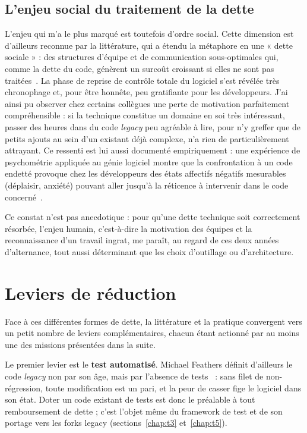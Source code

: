 \subsection{L'enjeu social du traitement de la dette}
L'enjeu qui m'a le plus marqué est toutefois d'ordre social. Cette dimension
est d'ailleurs reconnue par la littérature, qui a étendu la métaphore en une
« dette sociale » : des structures d'équipe et de communication sous-optimales
qui, comme la dette du code, génèrent un surcoût croissant si elles ne sont pas
traitées~\cite{tamburri2015}. La phase de reprise
de contrôle totale du logiciel s'est révélée très chronophage et, pour être
honnête, peu gratifiante pour les développeurs. J'ai ainsi pu observer chez
certains collègues une perte de motivation parfaitement compréhensible : si la
technique constitue un domaine en soi très intéressant, passer des heures dans
du code \emph{legacy} peu agréable à lire, pour n'y greffer que de petits
ajouts au sein d'un existant déjà complexe, n'a rien de particulièrement
attrayant. Ce ressenti est lui aussi documenté empiriquement : une expérience
de psychométrie appliquée au génie logiciel montre que la confrontation à un
code endetté provoque chez les développeurs des états affectifs négatifs
mesurables (déplaisir, anxiété) pouvant aller jusqu'à la réticence à intervenir
dans le code concerné~\cite{olsson2021}.

Ce constat n'est pas anecdotique : pour qu'une dette technique soit
correctement résorbée, l'enjeu humain, c'est-à-dire la motivation des équipes
et la reconnaissance d'un travail ingrat, me paraît, au regard de ces deux années d'alternance, tout
aussi déterminant que les choix d'outillage ou d'architecture.

\section{Leviers de réduction}
Face à ces différentes formes de dette, la littérature et la pratique
convergent vers un petit nombre de leviers complémentaires, chacun étant
actionné par au moins une des missions présentées dans la suite.

Le premier levier est le \textbf{test automatisé}. Michael Feathers définit
d'ailleurs le code \emph{legacy} non par son âge, mais par l'absence de
tests~\cite{feathers2004} : sans filet de non-régression, toute modification
est un pari, et la peur de casser fige le logiciel dans son état. Doter un
code existant de tests est donc le préalable à tout remboursement de dette ;
c'est l'objet même du framework de test et de son portage vers les forks
legacy (sections~\ref{chap:t3} et~\ref{chap:t5}).


